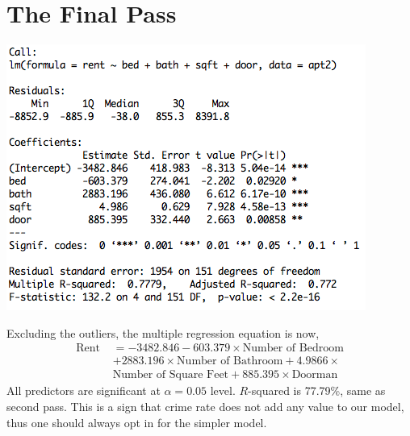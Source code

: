 \documentclass[a4 paper, 11 pt, twocolumn]{article}
\begin{document}
\section{The Final Pass}
\begin{center}
\includegraphics[scale=0.5]{mr4}
\end{center}
Excluding the outliers, the multiple regression equation is now,
\begin{align*}
\text{Rent } &= -3482.846 -603.379\times \text{Number of Bedroom} \\
&+ 2883.196\times \text{Number of Bathroom} + 4.9866 \times \\ &\text{Number of Square Feet} +885.395\times \text{Doorman}
\end{align*}
All predictors are significant at $\alpha = 0.05$ level. $R$-squared is 77.79\%, same as second pass. This is a sign that crime rate does not add any value to our model, thus one should always opt in for the simpler model.
\end{document}
